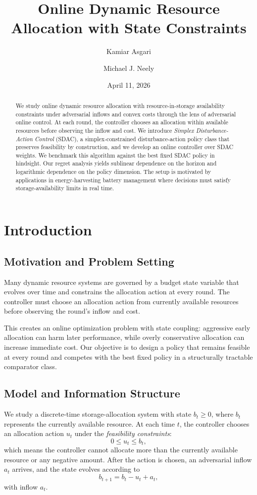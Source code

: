 \documentclass[11pt]{article}
\title{Online Dynamic Resource Allocation with State Constraints}
\author{Kamiar Asgari \and Michael J. Neely}
\date{April 11, 2026}
\begin{document}
\maketitle

\begin{abstract}
We study online dynamic resource allocation with resource-in-storage availability constraints under adversarial inflows and convex costs through the lens of adversarial online control. At each round, the controller chooses an allocation within available resources before observing the inflow and cost. We introduce \emph{Simplex Disturbance-Action Control} (SDAC), a simplex-constrained disturbance-action policy class that preserves feasibility by construction, and we develop an online controller over SDAC weights. We benchmark this algorithm against the best fixed SDAC policy in hindsight. Our regret analysis yields sublinear dependence on the horizon and logarithmic dependence on the policy dimension. The setup is motivated by applications in energy-harvesting battery management where decisions must satisfy storage-availability limits in real time.
\end{abstract}

\section{Introduction}
\label{sec:introduction}

\subsection{Motivation and Problem Setting}
Many dynamic resource systems are governed by a budget state variable that evolves over time and constrains the allocation action at every round. The controller must choose an allocation action from currently available resources before observing the round's inflow and cost.

This creates an online optimization problem with state coupling: aggressive early allocation can harm later performance, while overly conservative allocation can increase immediate cost. Our objective is to design a policy that remains feasible at every round and competes with the best fixed policy in a structurally tractable comparator class.

\subsection{Model and Information Structure}
We study a discrete-time storage-allocation system with state $b_t \geq 0$, where $b_t$ represents the currently available resource. At each time $t$, the controller chooses an allocation action $u_t$ under the \emph{feasibility constraints}:
\[
0 \leq u_t \leq b_t,
\]
which means the controller cannot allocate more than the currently available resource or any negative amount. After the action is chosen, an adversarial inflow $a_t$ arrives, and the state evolves according to
\[
b_{t+1} = b_t - u_t + a_t,
\]
with inflow $a_t$.
\end{document}
